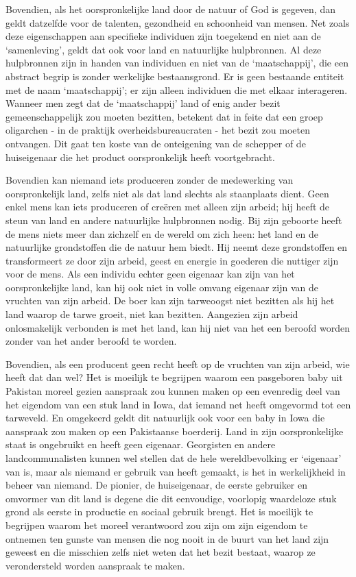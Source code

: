 \documentclass[
  a5paper,
  smalldemyvopaper,10pt,twoside,onecolumn,openright,extrafontsizes,hidelinks]{memoir}
\begin{document}
Bovendien, als het oorspronkelijke land door de natuur of God is
gegeven, dan geldt datzelfde voor de talenten, gezondheid en schoonheid
van mensen. Net zoals deze eigenschappen aan specifieke individuen zijn
toegekend en niet aan de `samenleving', geldt dat ook voor land en
natuurlijke hulpbronnen. Al deze hulpbronnen zijn in handen van
individuen en niet van de `maatschappij', die een abstract begrip is
zonder werkelijke bestaansgrond. Er is geen bestaande entiteit met de
naam `maatschappij'; er zijn alleen individuen die met elkaar
interageren. Wanneer men zegt dat de `maatschappij' land of enig ander
bezit gemeenschappelijk zou moeten bezitten, betekent dat in feite dat
een groep oligarchen - in de praktijk overheidsbureaucraten - het bezit
zou moeten ontvangen. Dit gaat ten koste van de onteigening van de
schepper of de huiseigenaar die het product oorspronkelijk heeft
voortgebracht.

Bovendien kan niemand iets produceren zonder de medewerking van
oorspronkelijk land, zelfs niet als dat land slechts als staanplaats
dient. Geen enkel mens kan iets produceren of creëren met alleen zijn
arbeid; hij heeft de steun van land en andere natuurlijke hulpbronnen
nodig. Bij zijn geboorte heeft de mens niets meer dan zichzelf en de
wereld om zich heen: het land en de natuurlijke grondstoffen die de
natuur hem biedt. Hij neemt deze grondstoffen en transformeert ze door
zijn arbeid, geest en energie in goederen die nuttiger zijn voor de
mens. Als een individu echter geen eigenaar kan zijn van het
oorspronkelijke land, kan hij ook niet in volle omvang eigenaar zijn van
de vruchten van zijn arbeid. De boer kan zijn tarweoogst niet bezitten
als hij het land waarop de tarwe groeit, niet kan bezitten. Aangezien
zijn arbeid onlosmakelijk verbonden is met het land, kan hij niet van
het een beroofd worden zonder van het ander beroofd te worden.

Bovendien, als een producent geen recht heeft op de vruchten van zijn
arbeid, wie heeft dat dan wel? Het is moeilijk te begrijpen waarom een
pasgeboren baby uit Pakistan moreel gezien aanspraak zou kunnen maken op
een evenredig deel van het eigendom van een stuk land in Iowa, dat
iemand net heeft omgevormd tot een tarweveld. En omgekeerd geldt dit
natuurlijk ook voor een baby in Iowa die aanspraak zou maken op een
Pakistaanse boerderij. Land in zijn oorspronkelijke staat is ongebruikt
en heeft geen eigenaar. Georgisten en andere landcommunalisten kunnen
wel stellen dat de hele wereldbevolking er `eigenaar' van is, maar als
niemand er gebruik van heeft gemaakt, is het in werkelijkheid in beheer
van niemand. De pionier, de huiseigenaar, de eerste gebruiker en
omvormer van dit land is degene die dit eenvoudige, voorlopig waardeloze
stuk grond als eerste in productie en sociaal gebruik brengt. Het is
moeilijk te begrijpen waarom het moreel verantwoord zou zijn om zijn
eigendom te ontnemen ten gunste van mensen die nog nooit in de buurt van
het land zijn geweest en die misschien zelfs niet weten dat het bezit
bestaat, waarop ze verondersteld worden aanspraak te maken.
\end{document}
